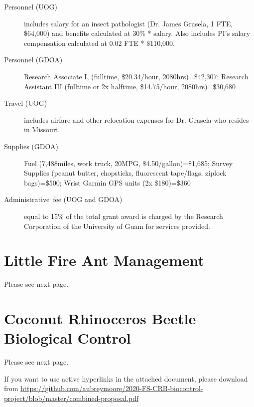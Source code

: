 \documentclass[12pt,letterpaper,english,bibliography=totocnumbered, abstract=on]{scrartcl}
\begin{document}
\begin{description}
	
	\item [{Personnel (UOG)}] includes salary for an insect pathologist (Dr. James Grasela, 1 FTE, \$64,000) and benefits calculated at 30\% * salary. Also includes PI's salary compensation calculated at 0.02 FTE * \$110,000.

	\item [{Personnel (GDOA)}] Research Associate I, (fulltime, \$20.34/hour, 2080hrs)=\$42,307; 
	Research Assistant III (fulltime or 2x halftime, \$14.75/hour, 2080hrs)=\$30,680
	
	\item [{Travel (UOG)}] includes airfare and other relocation expenses for Dr. Grasela who resides in Missouri.
	
	\item [{Supplies (GDOA)}]  
	Fuel (7,488miles, work truck, 20MPG, \$4.50/gallon)=\$1,685; 
	Survey Supplies (peanut butter, chopsticks, fluorescent tape/flags, ziplock bags)=\$500; 
	Wrist Garmin GPS units (2x \$180)=\$360 	
	
	\item [{Administrative~fee (UOG and GDOA)}] equal to 15\% of the total grant award
	is charged by the Research Corporation of the University of Guam for
	services provided.
	
\end{description}


\pagebreak
\section{Little Fire Ant Management}
Please see next page.



\section{Coconut Rhinoceros Beetle Biological Control}
Please see next page.

If you want to use active hyperlinks in the attached document, please download from 
\tiny{\url{https://github.com/aubreymoore/2020-FS-CRB-biocontrol-project/blob/master/combined-proposal.pdf}}


\end{document}
